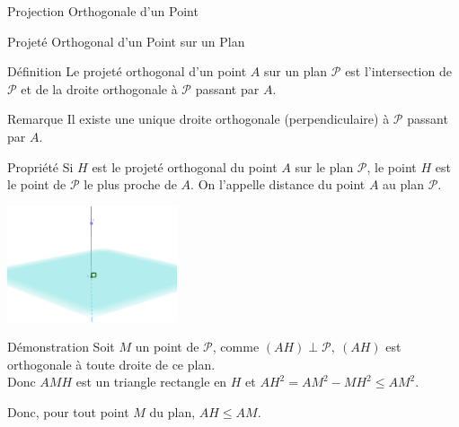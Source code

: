 \documentclass{coursbook}
\begin{document}
    \begin{Gpartie}{Projection Orthogonale d'un Point} 
        \begin{Spartie}{Projeté Orthogonal d'un Point sur un Plan} 
            \begin{SSSpartie}{Définition} 
                Le projeté orthogonal d'un point $A$ sur un plan $\mathcal{P}$ est l'intersection de $\mathcal{P}$ et de la droite orthogonale à $\mathcal{P}$ passant par $A$.
            \end{SSSpartie}
            \begin{SSSpartie}{Remarque} 
                Il existe une unique droite orthogonale (perpendiculaire) à $\mathcal{P}$ passant par $A$.
            \end{SSSpartie}
            \pagebreak
            \begin{SSSpartie}{Propriété} 
                Si $H$ est le projeté orthogonal du point $A$ sur le plan $\mathcal{P}$, le point $H$ est le point de $\mathcal{P}$ le plus proche de $A$. On l'appelle distance du point $A$ au plan $\mathcal{P}$.
                \begin{center}
                    \includegraphics[width=5cm]{rsc/12fig8.png}
                    \parbox{\linewidth}{}
                \end{center}

                \begin{SSSSpartie}{Démonstration} 
                    Soit $M$ un point de $\mathcal{P}$, comme $(AH)\perp\mathcal{P},~(AH)$ est orthogonale à toute droite de ce plan. \\ Donc $AMH$ est un triangle rectangle en $H$ et $AH^2=AM^2-MH^2\leq AM^2$.

                    Donc, pour tout point $M$ du plan, $AH\leq AM$.


\end{SSSSpartie}
\end{SSSpartie}
\end{Spartie}
\end{Gpartie}
\end{document}
